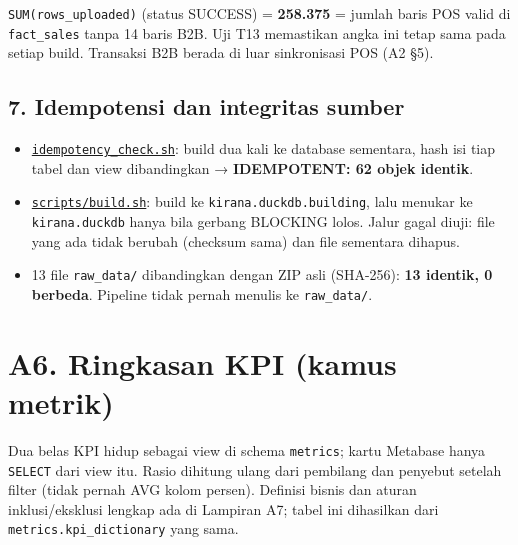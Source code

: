 \documentclass[10pt,a4paper]{article}
\providecommand{\tightlist}{\setlength{\itemsep}{1pt}\setlength{\parskip}{0pt}}
\begin{document}
\texttt{SUM(rows\_\allowbreak{}uploaded)} (status SUCCESS) = \textbf{258.375} = jumlah baris POS valid di \texttt{fact\_\allowbreak{}sales} tanpa 14 baris B2B. Uji T13
memastikan angka ini tetap sama pada setiap build. Transaksi B2B berada di luar sinkronisasi POS (A2 §5).

\subsection{7. Idempotensi dan integritas sumber}\label{idempotensi-dan-integritas-sumber}

\begin{itemize}
\tightlist
\item
  \href{https://github.com/titan2903/kirana-omnichannel-performance-intelligence/blob/master/scripts/idempotency_check.sh}{\texttt{idempotency\_\allowbreak{}check.sh}}: build dua kali ke database sementara, hash isi tiap tabel dan view dibandingkan → \textbf{IDEMPOTENT: 62 objek identik}.
\item
  \href{https://github.com/titan2903/kirana-omnichannel-performance-intelligence/blob/master/scripts/build.sh}{\texttt{scripts/build.sh}}: build ke \texttt{kirana.duckdb.building}, lalu menukar ke \texttt{kirana.duckdb} hanya bila gerbang BLOCKING lolos. Jalur gagal diuji: file yang ada tidak berubah (checksum sama) dan file sementara dihapus.
\item
  13 file \texttt{raw\_\allowbreak{}data/} dibandingkan dengan ZIP asli (SHA-256): \textbf{13 identik, 0 berbeda}. Pipeline tidak pernah menulis ke \texttt{raw\_\allowbreak{}data/}.
\end{itemize}

\section{A6. Ringkasan KPI (kamus metrik)}\label{a6.-ringkasan-kpi-kamus-metrik}

Dua belas KPI hidup sebagai view di schema \texttt{metrics}; kartu Metabase hanya \texttt{SELECT} dari view itu. Rasio dihitung ulang dari pembilang
dan penyebut setelah filter (tidak pernah AVG kolom persen). Definisi bisnis dan aturan inklusi/eksklusi lengkap ada di Lampiran A7;
tabel ini dihasilkan dari \texttt{metrics.kpi\_\allowbreak{}dictionary} yang sama.
\end{document}
